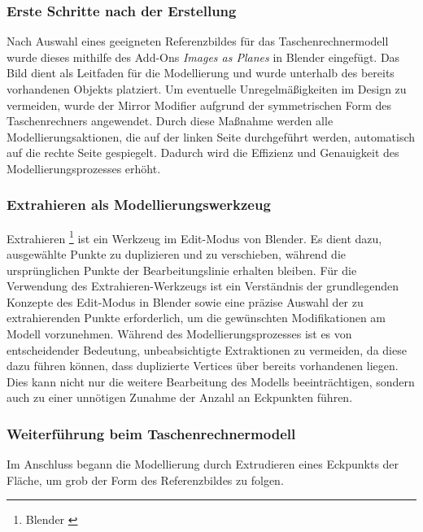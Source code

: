 \subsubsection*{Erste Schritte nach der Erstellung}
Nach Auswahl eines geeigneten Referenzbildes für das Taschenrechnermodell wurde dieses mithilfe des Add-Ons \textit{Images as Planes} in Blender eingefügt. Das Bild dient als Leitfaden für die Modellierung und wurde unterhalb des bereits vorhandenen Objekts platziert. Um eventuelle Unregelmäßigkeiten im Design zu vermeiden, wurde der Mirror Modifier aufgrund der symmetrischen Form des Taschenrechners angewendet. Durch diese Maßnahme werden alle Modellierungsaktionen, die auf der linken Seite durchgeführt werden, automatisch auf die rechte Seite gespiegelt. Dadurch wird die Effizienz und Genauigkeit des Modellierungsprozesses erhöht.

\subsubsection*{Extrahieren als Modellierungswerkzeug}
Extrahieren \footnote{Blender \cite{Extrude}} ist ein Werkzeug im Edit-Modus von Blender. Es dient dazu, ausgewählte Punkte zu duplizieren und zu verschieben, während die ursprünglichen Punkte der Bearbeitungslinie erhalten bleiben.
Für die Verwendung des Extrahieren-Werkzeugs ist ein Verständnis der grundlegenden Konzepte des Edit-Modus in Blender sowie eine präzise Auswahl der zu extrahierenden Punkte erforderlich, um die gewünschten Modifikationen am Modell vorzunehmen. Während des Modellierungsprozesses ist es von entscheidender Bedeutung, unbeabsichtigte Extraktionen zu vermeiden, da diese dazu führen können, dass duplizierte Vertices über bereits vorhandenen liegen. Dies kann nicht nur die weitere Bearbeitung des Modells beeinträchtigen, sondern auch zu einer unnötigen Zunahme der Anzahl an Eckpunkten führen.

\subsubsection*{Weiterführung beim Taschenrechnermodell}
Im Anschluss begann die Modellierung durch Extrudieren eines Eckpunkts der Fläche, um grob der Form des Referenzbildes zu folgen.

